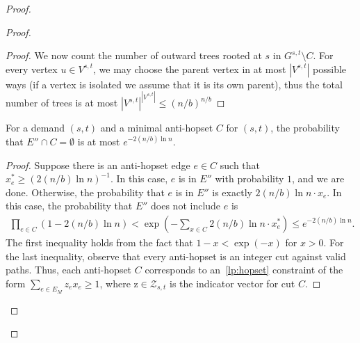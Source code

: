 \begin{proof}
\begin{proof}
\begin{proof}
            We now count the number of outward trees rooted at $s$ in $G^{s,t} \setminus C$. For every vertex $u \in V^{s,t}$, we may choose the parent vertex in at most $|V^{s,t}|$ possible ways (if a vertex is isolated we assume that it is its own parent), thus the total number of trees is at most $|V^{s,t}|^{|V^{s,t}|} \leq (n / b)^{n/b}$
        \end{proof}

        \begin{proposition} \label{prop:thin2}
            For a demand $(s,t)$ and a minimal anti-hopset $C$ for $(s,t)$, the probability that $E'' \cap C = \emptyset$ is at most $e^{-2(n/b)\ln{n}}$.
        \end{proposition}
        \begin{proof}
            Suppose there is an anti-hopset edge $e \in C$ such that $x_e^* \geq (2(n/b)\ln{n})^{-1}$. In this case, $e$ is in $E''$ with probability $1$, and we are done. Otherwise, the probability that $e$ is in $E''$ is exactly $2(n/b)\ln{n} \cdot x_e$. In this case, the probability that $E''$ does not include $e$ is 
            \begin{align*}
                \prod_{e \in C} \left( 1 - 2 (n/b) \ln{n} \right) < \exp{\left(-\sum_{x \in C} 2 (n/b) \ln{n} \cdot x^*_e \right)} \leq e^{-2 (n/b) \ln{n}}.
            \end{align*}
            The first inequality holds from the fact that $1-x < \exp{(-x)}$ for $x > 0$. For the  last inequality, observe that every anti-hopset is an integer cut against valid paths. Thus, each anti-hopset $C$ corresponds to an~\ref{lp:hopset} constraint of the form $\sum_{e \in E_M} z_e x_e \geq 1$, where $\bm{\mathrm{z}} \in \mathcal{Z}_{s,t}$ is the indicator vector for cut $C$.
        \end{proof}
        

\end{proof}
\end{proof}
